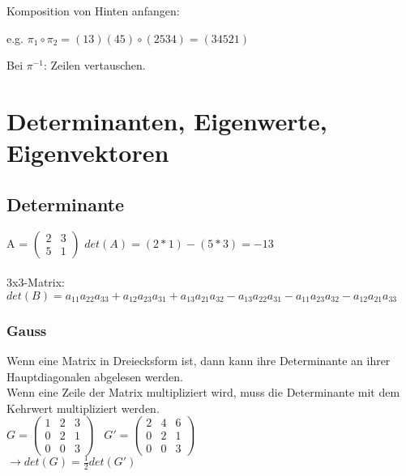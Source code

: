 \documentclass[a4paper,landscape, 11pt]{article}
\begin{document}
\begin{multicols}{5}
\begin{small}
    Komposition von Hinten anfangen:
    
    e.g. $\pi_1\circ\pi_2=(13)(45)\circ(2534)=(34521)$
    
    Bei $\pi^{-1}$: Zeilen vertauschen.
    
    \section{Determinanten, Eigenwerte, Eigenvektoren}
        \subsection{Determinante}
        A = $\left(
        \begin{matrix}
            2 & 3 \\
            5 & 1
        \end{matrix}
        \right)$ \hspace{2pt} 
        $det(A) = (2*1) - (5*3) = -13$ \\ \\
        3x3-Matrix:\\
        $det(B) = a_{11} a_{22} a_{33} + a_{12} a_{23} a_{31} + a_{13} a_{21} a_{32} - a_{13} a_{22} a_{31} - a_{11} a_{23} a_{32} - a_{12} a_{21} a_{33}$  
        
        \subsubsection{Gauss}
        Wenn eine Matrix in Dreiecksform ist, dann kann ihre Determinante an ihrer Hauptdiagonalen abgelesen werden. \\
        Wenn eine Zeile der Matrix multipliziert wird, muss die Determinante mit dem Kehrwert multipliziert werden.\\
        
        $G = \begin{pmatrix}
            1 & 2 & 3 \\
            0 & 2 & 1 \\
            0 & 0 & 3
        \end{pmatrix}
        \hspace{10pt}
        G' = \begin{pmatrix}
        
        2 & 4 & 6 \\
        0 & 2 & 1 \\
        0 & 0 & 3
        \end{pmatrix}
        $
        \\
        $\rightarrow det(G) = \frac{1}{2} det(G')$

\end{small}
\end{multicols}
\end{document}
